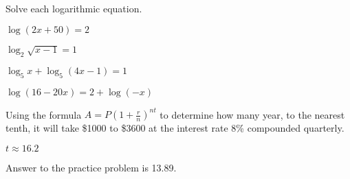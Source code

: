 \begin{exercise}
Solve each logarithmic equation.

\noindent 
\begin{enumerate*}[label=(\arabic*)~~]
\item $\log(2x+50)=2$\hspace{0.3\textwidth}
\item $\log_2 \sqrt{x-1}=1$
\end{enumerate*}

\vspace{2.5cm}
\noindent
\begin{enumerate*}[resume*]
\item $\log_5x+\log_5(4x-1)=1$\hspace{0.26\textwidth}
\item $\log(16-20x)=2+\log(-x)$
\end{enumerate*}
\end{exercise}
\vspace{2cm}

\begin{exercise}
Using the formula $A=P(1+\frac rn)^{nt}$ to determine how many year, to the nearest tenth, it will take \$1000 to \$3600 at the interest rate 8\% compounded quarterly.
\end{exercise}
$t\approx 16.2$

Answer to the practice problem is 13.89. 

